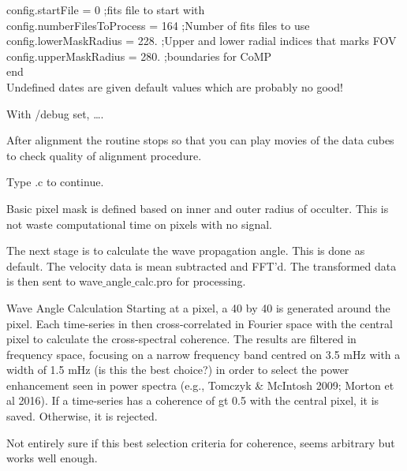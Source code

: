 \documentclass{article}
\begin{document}
 \hspace{1.5cm}      config.startFile = 0                           ;fits file to start with\\

 \hspace{1.5cm}      config.numberFilesToProcess = 164                  ;Number of fits files to use\\

 \hspace{1.5cm}      config.lowerMaskRadius = 228.                       ;Upper and lower radial indices that marks FOV\\

 \hspace{1.5cm}      config.upperMaskRadius = 280.                       ;boundaries for CoMP\\

 \hspace{1cm} end\\

Undefined dates are given default values which are probably no good!




With /debug set, ….




After alignment the routine stops so that you can play movies of the data cubes to check quality of
alignment procedure.

Type .c to continue.

Basic pixel mask is defined based on inner and outer radius of occulter. This is not waste computational time on pixels with no signal.

The next stage is to calculate the wave propagation angle. This is done as default. The velocity data is mean subtracted and FFT'd. The transformed data is then sent to wave$\_$angle$\_$calc.pro for
processing.

Wave Angle Calculation
Starting at a pixel, a 40 by 40 is generated around the pixel. Each time-series in then cross-correlated in Fourier space with the central pixel to calculate the cross-spectral coherence. The results are filtered in frequency space, focusing on a narrow frequency band centred on 3.5 mHz with a width of 1.5 mHz (is this the best choice?) in order to select the power enhancement seen in power spectra (e.g., Tomczyk \& McIntosh 2009; Morton et al 2016). If a time-series has a coherence of gt 0.5 with the central pixel, it is saved. Otherwise, it is rejected. 

Not entirely sure if this best selection criteria for coherence, seems arbitrary but works well enough.
\end{document}

